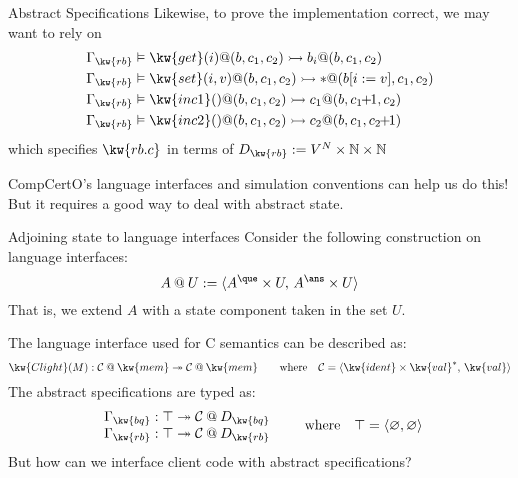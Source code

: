 \documentclass[aspectratio=1610,12pt]{beamer}
\begin{document}
\begin{frame}{Abstract Specifications} %
Likewise,
to prove the implementation correct,
we may want to rely on
\begin{align*}
  \Gamma_\kw{rb} &\vDash
    \kw{get}(i)@(b, c_1, c_2) \rightarrowtail
    b_i@(b, c_1, c_2) \\
  \Gamma_\kw{rb} &\vDash
    \kw{set}(i, v)@(b, c_1, c_2) \rightarrowtail
    *@(b[i := v], c_1, c_2) \\
  \Gamma_\kw{rb} &\vDash
    \kw{inc1}()@(b, c_1, c_2) \rightarrowtail
    c_1@(b, c_1\!\!+\!\!1, c_2) \\
  \Gamma_\kw{rb} &\vDash
    \kw{inc2}()@(b, c_1, c_2) \rightarrowtail
    c_2@(b, c_1, c_2\!\!+\!\!1)
\end{align*}
which specifies $\kw{rb.c}$ in terms of
$D_\kw{rb} := V^N \times \mathbb{N} \times \mathbb{N}$

\vfill\pause

CompCertO's language interfaces and simulation conventions can help us do this! \\
But it requires a good way to deal with abstract state.
\end{frame}

\begin{frame}{Adjoining state to language interfaces} %
Consider the following construction on language interfaces:
\[
  A \mathbin@ U := \langle A^\que \times U, \, A^\ans \times U \rangle
\]
That is, we extend $A$ with a state component taken in the set $U$.

\vfill \pause
The language interface used for C semantics can be described as:
\[
  \kw{Clight}(M) : \mathcal{C} \mathbin@ \kw{mem} \twoheadrightarrow
      \mathcal{C} \mathbin@ \kw{mem}
  \qquad \text{where} \quad
  \mathcal{C} = \langle \kw{ident} \times \kw{val}^*, \, \kw{val} \rangle
\]
\pause
The abstract specifications are typed as:
\[
  \begin{array}{c}
    \Gamma_\kw{bq} : \top \twoheadrightarrow \mathcal{C} \mathbin@ D_\kw{bq} \\
    \Gamma_\kw{rb} : \top \twoheadrightarrow \mathcal{C} \mathbin@ D_\kw{rb}
  \end{array}
  \qquad \text{where} \quad
  \top = \langle \varnothing, \varnothing \rangle
\]
But how can we interface client code with abstract specifications?
\end{frame}
\end{document}
